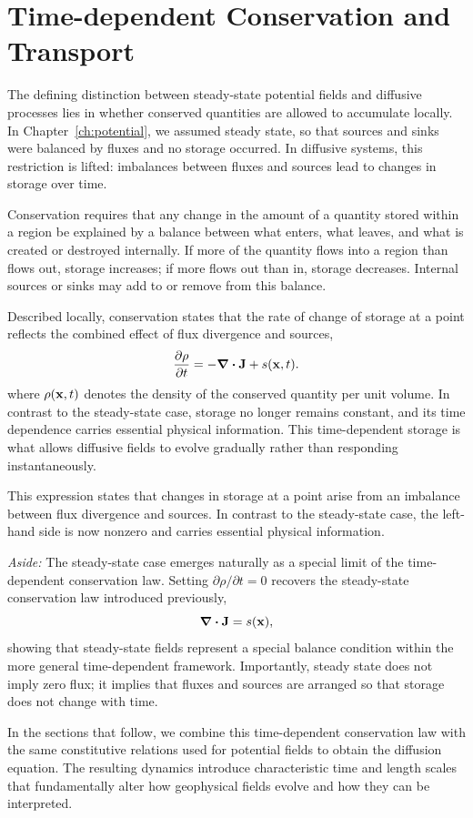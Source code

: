 \section{Time-dependent Conservation and Transport}

The defining distinction between steady-state potential fields and diffusive processes lies in whether conserved quantities are allowed to accumulate locally.  In Chapter~\ref{ch:potential}, we assumed steady state, so that sources and sinks were balanced by fluxes and no storage occurred. In diffusive systems, this restriction is lifted: imbalances between fluxes and sources lead to changes in storage over time.

Conservation requires that any change in the amount of a quantity stored within a region be explained by a balance between what enters, what leaves, and what is created or destroyed internally. If more of the quantity flows into a region than flows out, storage increases; if more flows out than in, storage decreases. Internal sources or sinks may add to or remove from this balance.

Described locally, conservation states that the rate of change of storage at a point reflects the combined effect of flux divergence and sources,
\[
    \pdv{\rho}{t} = -\div \vb{J} + s(\vb{x},t).
\]
where $\rho(\vb{x},t)$ denotes the density of the conserved quantity per unit volume. In contrast to the steady-state case, storage no longer remains constant, and its time dependence carries essential physical information. This time-dependent storage is what allows diffusive fields to evolve gradually rather than responding instantaneously. 

This expression states that changes in storage at a point arise from an imbalance between flux divergence and sources. In contrast to the steady-state case, the left-hand side is now nonzero and carries essential physical information.

\emph{Aside:} The steady-state case emerges naturally as a special limit of the time-dependent conservation law. Setting $\partial\rho/\partial t = 0$ recovers the steady-state conservation law introduced previously,
\[
    \div \vb{J} = s(\vb{x}),
\]
showing that steady-state fields represent a special balance condition within the more general time-dependent framework. Importantly, steady state does not imply zero flux; it implies that fluxes and sources are arranged so that storage does not change with time.

In the sections that follow, we combine this time-dependent conservation law with the same constitutive relations used for potential fields to obtain the diffusion equation. The resulting dynamics introduce characteristic time and length scales that fundamentally alter how geophysical fields evolve and how they can be interpreted.

